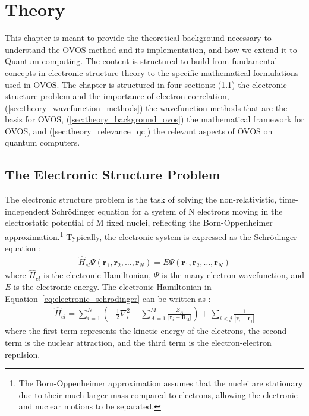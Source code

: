 \chapter{Theory}
\label{ch:theory}

This chapter is meant to provide the theoretical background necessary to understand the OVOS method and its implementation, and how we extend it to Quantum computing. The content is structured to build from fundamental concepts in electronic structure theory to the specific mathematical formulations used in OVOS. The chapter is structured in four sections: (\ref{sec:theory_elec_struct_prob}) the electronic structure problem and the importance of electron correlation, (\ref{sec:theory_wavefunction_methods}) the wavefunction methods that are the basis for OVOS, (\ref{sec:theory_background_ovos}) the mathematical framework for OVOS, and (\ref{sec:theory_relevance_qc}) the relevant aspects of OVOS on quantum computers. 

\section{The Electronic Structure Problem}
\label{sec:theory_elec_struct_prob}

The electronic structure problem is the task of solving the non-relativistic, time-independent Schrödinger equation for a system of N electrons moving in the electrostatic potential of M fixed nuclei, reflecting the Born-Oppenheimer approximation.\footnote{The Born-Oppenheimer approximation assumes that the nuclei are stationary due to their much larger mass compared to electrons, allowing the electronic and nuclear motions to be separated.}
Typically, the electronic system is expressed as the Schrödinger equation \cite{Helgaker2000}:
\begin{align}
    \label{eq:electronic_schrodinger}
    \hat{H}_{el} \Psi(\mathbf{r}_1, \mathbf{r}_2, \ldots, \mathbf{r}_N) = E \Psi(\mathbf{r}_1, \mathbf{r}_2, \ldots, \mathbf{r}_N)
\end{align}
where \(\hat{H}_{el}\) is the electronic Hamiltonian, \(\Psi\) is the many-electron wavefunction, and \(E\) is the electronic energy. The electronic Hamiltonian in Equation~\ref{eq:electronic_schrodinger} can be written as \cite{Helgaker2000}:
\begin{align}
    \label{eq:electronic_hamiltonian}
    \hat{H}_{el} = \sum_{i=1}^N \left( -\frac{1}{2} \nabla_i^2 - \sum_{A=1}^M \frac{Z_A}{|\mathbf{r}_i - \mathbf{R}_A|} \right) + \sum_{i<j} \frac{1}{|\mathbf{r}_i - \mathbf{r}_j|}
\end{align}
where the first term represents the kinetic energy of the electrons, the second term is the nuclear attraction, and the third term is the electron-electron repulsion.

